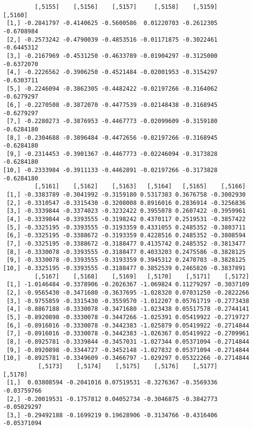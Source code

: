\documentclass[
  letterpaper,
  DIV=11,
  numbers=noendperiod]{scrreprt}
\begin{document}
\begin{verbatim}
         [,5155]    [,5156]    [,5157]     [,5158]    [,5159]    [,5160]
 [1,] -0.2841797 -0.4140625 -0.5600586  0.01220703 -0.2612305 -0.6708984
 [2,] -0.2573242 -0.4790039 -0.4853516 -0.01171875 -0.3022461 -0.6445312
 [3,] -0.2167969 -0.4531250 -0.4633789 -0.01904297 -0.3125000 -0.6372070
 [4,] -0.2226562 -0.3906250 -0.4521484 -0.02001953 -0.3154297 -0.6303711
 [5,] -0.2246094 -0.3862305 -0.4482422 -0.02197266 -0.3164062 -0.6279297
 [6,] -0.2270508 -0.3872070 -0.4477539 -0.02148438 -0.3168945 -0.6279297
 [7,] -0.2280273 -0.3876953 -0.4467773 -0.02099609 -0.3159180 -0.6284180
 [8,] -0.2304688 -0.3896484 -0.4472656 -0.02197266 -0.3168945 -0.6284180
 [9,] -0.2314453 -0.3901367 -0.4467773 -0.02246094 -0.3173828 -0.6284180
[10,] -0.2333984 -0.3911133 -0.4462891 -0.02197266 -0.3173828 -0.6284180
         [,5161]    [,5162]    [,5163]   [,5164]   [,5165]    [,5166]
 [1,] -0.3383789 -0.3041992 -0.3159180 0.5317383 0.3676758 -0.3002930
 [2,] -0.3310547 -0.3315430 -0.3208008 0.8916016 0.2836914 -0.3256836
 [3,] -0.3339844 -0.3374023 -0.3232422 0.3955078 0.2607422 -0.3959961
 [4,] -0.3339844 -0.3393555 -0.3198242 0.4370117 0.2519531 -0.3857422
 [5,] -0.3325195 -0.3393555 -0.3193359 0.4331055 0.2485352 -0.3803711
 [6,] -0.3325195 -0.3388672 -0.3193359 0.4228516 0.2485352 -0.3808594
 [7,] -0.3325195 -0.3388672 -0.3188477 0.4135742 0.2485352 -0.3813477
 [8,] -0.3330078 -0.3393555 -0.3188477 0.4033203 0.2475586 -0.3828125
 [9,] -0.3330078 -0.3393555 -0.3193359 0.3945312 0.2470703 -0.3828125
[10,] -0.3325195 -0.3393555 -0.3188477 0.3852539 0.2465820 -0.3837891
         [,5167]    [,5168]    [,5169]   [,5170]    [,5171]    [,5172]
 [1,] -1.0146484 -0.3378906 -0.2026367 -1.069824 0.11279297 -0.3037109
 [2,] -0.9565430 -0.3471680 -0.3637695 -1.028320 0.07031250 -0.2822266
 [3,] -0.9755859 -0.3315430 -0.3559570 -1.012207 0.05761719 -0.2773438
 [4,] -0.8867188 -0.3330078 -0.3471680 -1.023438 0.05517578 -0.2744141
 [5,] -0.8920898 -0.3330078 -0.3447266 -1.025391 0.05419922 -0.2719727
 [6,] -0.8916016 -0.3330078 -0.3442383 -1.025879 0.05419922 -0.2714844
 [7,] -0.8916016 -0.3330078 -0.3442383 -1.026367 0.05419922 -0.2709961
 [8,] -0.8925781 -0.3339844 -0.3457031 -1.027344 0.05371094 -0.2714844
 [9,] -0.8920898 -0.3344727 -0.3452148 -1.027832 0.05371094 -0.2714844
[10,] -0.8925781 -0.3349609 -0.3466797 -1.029297 0.05322266 -0.2714844
          [,5173]    [,5174]    [,5175]    [,5176]    [,5177]     [,5178]
 [1,]  0.03808594 -0.2041016 0.07519531 -0.3276367 -0.3569336 -0.03759766
 [2,] -0.20019531 -0.1757812 0.04052734 -0.3046875 -0.3842773 -0.05029297
 [3,] -0.29492188 -0.1699219 0.19628906 -0.3134766 -0.4316406 -0.05371094

\end{verbatim}
\end{document}
